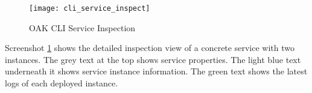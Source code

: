\begin{figure}[p]
    \begin{adjustwidth}{-0.1\paperwidth}{-0.1\paperwidth}
        \centering
        \texttt{[image: cli\_service\_inspect]}
        \caption{OAK CLI Service Inspection}
        \label{fig:cli_service_inspection}
    \end{adjustwidth}
\end{figure}
Screenshot \ref{fig:cli_service_inspection} shows the detailed inspection view of a concrete service with two instances.
The grey text at the top shows service properties.
The light blue text underneath it shows service instance information.
The green text shows the latest logs of each deployed instance.
